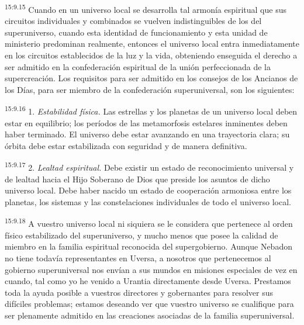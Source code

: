 \par
\textsuperscript{15:9.15} Cuando en un universo local se desarrolla tal armonía espiritual que sus circuitos individuales y combinados se vuelven indistinguibles de los del superuniverso, cuando esta identidad de funcionamiento y esta unidad de ministerio predominan realmente, entonces el universo local entra inmediatamente en los circuitos establecidos de la luz y la vida, obteniendo enseguida el derecho a ser admitido en la confederación espiritual de la unión perfeccionada de la supercreación. Los requisitos para ser admitido en los consejos de los Ancianos de los Días, para ser miembro de la confederación superuniversal, son los siguientes:

\par
\textsuperscript{15:9.16} 1. \textit{Estabilidad física.} Las estrellas y los planetas de un universo local deben estar en equilibrio; los períodos de las metamorfosis estelares inminentes deben haber terminado. El universo debe estar avanzando en una trayectoria clara; su órbita debe estar estabilizada con seguridad y de manera definitiva.

\par
\textsuperscript{15:9.17} 2. \textit{Lealtad espiritual.} Debe existir un estado de reconocimiento universal y de lealtad hacia el Hijo Soberano de Dios que preside los asuntos de dicho universo local. Debe haber nacido un estado de cooperación armoniosa entre los planetas, los sistemas y las constelaciones individuales de todo el universo local.

\par
\textsuperscript{15:9.18} A vuestro universo local ni siquiera se le considera que pertenece al orden físico estabilizado del superuniverso, y mucho menos que posee la calidad de miembro en la familia espiritual reconocida del supergobierno. Aunque Nebadon no tiene todavía representantes en Uversa, a nosotros que pertenecemos al gobierno superuniversal nos envían a sus mundos en misiones especiales de vez en cuando, tal como yo he venido a Urantia directamente desde Uversa. Prestamos toda la ayuda posible a vuestros directores y gobernantes para resolver sus difíciles problemas; estamos deseando ver que vuestro universo se cualifique para ser plenamente admitido en las creaciones asociadas de la familia superuniversal.

